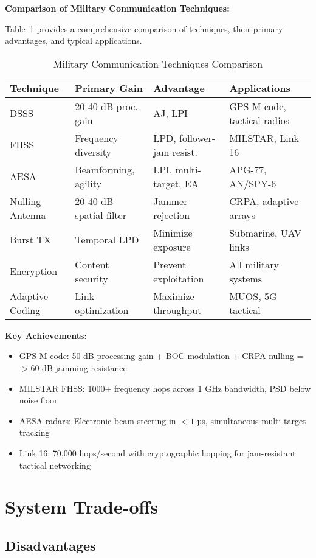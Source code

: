 \textbf{Comparison of Military Communication Techniques:}

Table~\ref{tab:military-techniques} provides a comprehensive comparison of techniques, their primary advantages, and typical applications.

\begin{table}[h]
\centering
\caption{Military Communication Techniques Comparison}
\label{tab:military-techniques}
\begin{tabular}{llll}
\toprule
\textbf{Technique} & \textbf{Primary Gain} & \textbf{Advantage} & \textbf{Applications} \\
\midrule
DSSS & 20-40 dB proc. gain & AJ, LPI & GPS M-code, tactical radios \\
FHSS & Frequency diversity & LPD, follower-jam resist. & MILSTAR, Link 16 \\
AESA & Beamforming, agility & LPI, multi-target, EA & APG-77, AN/SPY-6 \\
Nulling Antenna & 20-40 dB spatial filter & Jammer rejection & CRPA, adaptive arrays \\
Burst TX & Temporal LPD & Minimize exposure & Submarine, UAV links \\
Encryption & Content security & Prevent exploitation & All military systems \\
Adaptive Coding & Link optimization & Maximize throughput & MUOS, 5G tactical \\
\bottomrule
\end{tabular}
\end{table}

\textbf{Key Achievements:}
\begin{itemize}
\item GPS M-code: 50 dB processing gain + BOC modulation + CRPA nulling = $>60$ dB jamming resistance
\item MILSTAR FHSS: 1000+ frequency hops across 1 GHz bandwidth, PSD below noise floor
\item AESA radars: Electronic beam steering in $<1$ µs, simultaneous multi-target tracking
\item Link 16: 70,000 hops/second with cryptographic hopping for jam-resistant tactical networking
\end{itemize}

\section{System Trade-offs}

\subsection{Disadvantages}

